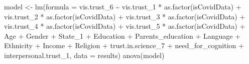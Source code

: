 \documentclass[
]{article}
\newenvironment{Shaded}{\begin{snugshade}}{\end{snugshade}}
\newcommand{\AttributeTok}[1]{\textcolor[rgb]{0.77,0.63,0.00}{#1}}
\newcommand{\FunctionTok}[1]{\textcolor[rgb]{0.00,0.00,0.00}{#1}}
\newcommand{\NormalTok}[1]{#1}
\newcommand{\OtherTok}[1]{\textcolor[rgb]{0.56,0.35,0.01}{#1}}
\newcommand{\SpecialCharTok}[1]{\textcolor[rgb]{0.00,0.00,0.00}{#1}}
\begin{document}
\begin{Shaded}
\begin{Highlighting}[]
\NormalTok{model }\OtherTok{\textless{}{-}} \FunctionTok{lm}\NormalTok{(}\AttributeTok{formula =}\NormalTok{ vis.trust\_6 }\SpecialCharTok{\textasciitilde{}}\NormalTok{ vis.trust\_1 }\SpecialCharTok{*} \FunctionTok{as.factor}\NormalTok{(isCovidData) }\SpecialCharTok{+} 
\NormalTok{              vis.trust\_2 }\SpecialCharTok{*} \FunctionTok{as.factor}\NormalTok{(isCovidData) }\SpecialCharTok{+} 
\NormalTok{              vis.trust\_3 }\SpecialCharTok{*} \FunctionTok{as.factor}\NormalTok{(isCovidData) }\SpecialCharTok{+} 
\NormalTok{              vis.trust\_4 }\SpecialCharTok{*} \FunctionTok{as.factor}\NormalTok{(isCovidData) }\SpecialCharTok{+} 
\NormalTok{              vis.trust\_5 }\SpecialCharTok{*} \FunctionTok{as.factor}\NormalTok{(isCovidData) }\SpecialCharTok{+} 
\NormalTok{              Age }\SpecialCharTok{+}\NormalTok{ Gender }\SpecialCharTok{+}\NormalTok{ State\_1 }\SpecialCharTok{+}\NormalTok{ Education }\SpecialCharTok{+}\NormalTok{ Parents\_education }\SpecialCharTok{+}\NormalTok{ Language }\SpecialCharTok{+} 
\NormalTok{              Ethnicity }\SpecialCharTok{+}\NormalTok{ Income }\SpecialCharTok{+}\NormalTok{ Religion }\SpecialCharTok{+}\NormalTok{ trust.in.science\_7 }\SpecialCharTok{+} 
\NormalTok{              need\_for\_cognition }\SpecialCharTok{+}\NormalTok{ interpersonal.trust\_1,}
            \AttributeTok{data =}\NormalTok{ results)}
\FunctionTok{anova}\NormalTok{(model)}
\end{Highlighting}
\end{Shaded}
\end{document}
